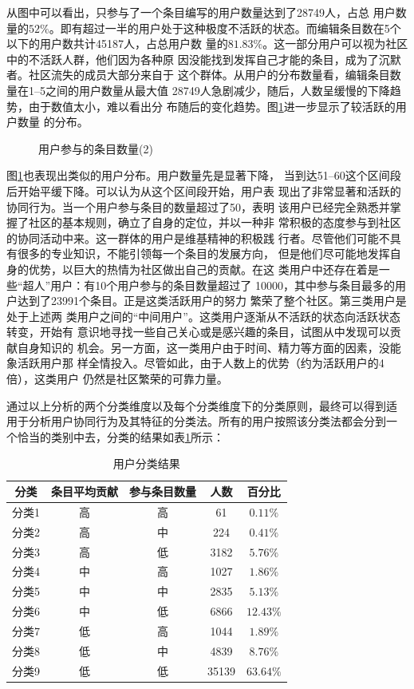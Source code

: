 从图中可以看出，只参与了一个条目编写的用户数量达到了28749人，占总
用户数量的$52\%$。即有超过一半的用户处于这种极度不活跃的状态。而编辑条目数在5个以下的用户数共计45187人，占总用户数
量的$81.83\%$。这一部分用户可以视为社区中的不活跃人群，他们因为各种原
因没能找到发挥自己才能的条目，成为了沉默者。社区流失的成员大部分来自于
这个群体。从用户的分布数量看，编辑条目数量在1--5之间的用户数量从最大值
28749人急剧减少，随后，人数呈缓慢的下降趋势，由于数值太小，难以看出分
布随后的变化趋势。图\ref{fig:user-entry-2}进一步显示了较活跃的用户数量
的分布。
\begin{figure}[htb]
  \centering
  
 \caption{\small{用户参与的条目数量(2)}}
  \label{fig:user-entry-2}
\end{figure}

图\ref{fig:user-entry-2}也表现出类似的用户分布。用户数量先是显著下降，
当到达51--60这个区间段后开始平缓下降。可以认为从这个区间段开始，用户表
现出了非常显著和活跃的协同行为。当一个用户参与条目的数量超过了50，表明
该用户已经完全熟悉并掌握了社区的基本规则，确立了自身的定位，并以一种非
常积极的态度参与到社区的协同活动中来。这一群体的用户是维基精神的积极践
行者。尽管他们可能不具有很多的专业知识，不能引领每一个条目的发展方向，
但是他们尽可能地发挥自身的优势，以巨大的热情为社区做出自己的贡献。在这
类用户中还存在着是一些“超人”用户：有10个用户参与的条目数量超过了
10000，其中参与条目最多的用户达到了23991个条目。正是这类活跃用户的努力
繁荣了整个社区。第三类用户是处于上述两
类用户之间的“中间用户”。这类用户逐渐从不活跃的状态向活跃状态转变，开始有
意识地寻找一些自己关心或是感兴趣的条目，试图从中发现可以贡献自身知识的
机会。另一方面，这一类用户由于时间、精力等方面的因素，没能象活跃用户那
样全情投入。尽管如此，由于人数上的优势（约为活跃用户的4倍），这类用户
仍然是社区繁荣的可靠力量。

通过以上分析的两个分类维度以及每个分类维度下的分类原则，最终可以得到适
用于分析用户协同行为及其特征的分类法。所有的用户按照该分类法都会分到一
个恰当的类别中去，分类的结果如表\ref{tab:category}所示：
\begin{table}[htb]
  \centering
 \small
 \caption{\small{用户分类结果}}
  \begin{tabular}{|c|c|c|c|c|}
\hline
    分类&条目平均贡献&参与条目数量&人数&百分比\\\hline
    分类1&高&高&61&$0.11\%$\\\hline
    分类2&高&中&224&$0.41\%$\\\hline
    分类3&高&低&3182&$5.76\%$\\\hline
    分类4&中&高&1027&$1.86\%$\\\hline
    分类5&中&中&2835&$5.13\%$\\\hline
    分类6&中&低&6866&$12.43\%$\\\hline
    分类7&低&高&1044&$1.89\%$\\\hline
    分类8&低&中&4839&$8.76\%$\\\hline
    分类9&低&低&35139&$63.64\%$\\\hline
  \end{tabular}
 
  \label{tab:category}
\end{table}

